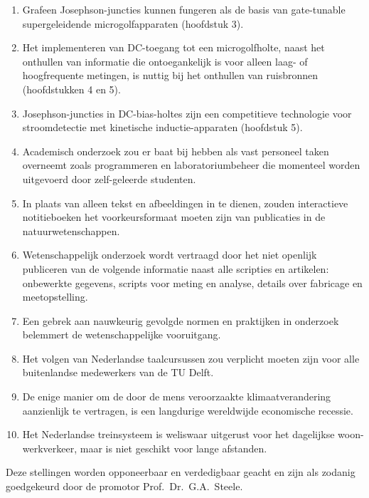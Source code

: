 \documentclass{dissertation-edit}
\begin{document}
{\begin{enumerate}
\item Grafeen Josephson-juncties kunnen fungeren als de basis van gate-tunable supergeleidende microgolfapparaten (hoofdstuk 3).
%
\item Het implementeren van DC-toegang tot een microgolfholte, naast het onthullen van informatie die ontoegankelijk is voor alleen laag- of hoogfrequente metingen, is nuttig bij het onthullen van ruisbronnen (hoofdstukken 4 en 5).
%
\item Josephson-juncties in DC-bias-holtes zijn een competitieve technologie voor stroomdetectie met kinetische inductie-apparaten (hoofdstuk 5).
%
\item Academisch onderzoek zou er baat bij hebben als vast personeel taken overneemt zoals programmeren en laboratoriumbeheer die momenteel worden uitgevoerd door zelf-geleerde studenten.
%
\item In plaats van alleen tekst en afbeeldingen in te dienen, zouden interactieve notitieboeken het voorkeursformaat moeten zijn van publicaties in de natuurwetenschappen.
%
\item Wetenschappelijk onderzoek wordt vertraagd door het niet openlijk publiceren van de volgende informatie naast alle scripties en artikelen: onbewerkte gegevens, scripts voor meting en analyse, details over fabricage en meetopstelling.
%
\item Een gebrek aan nauwkeurig gevolgde normen en praktijken in onderzoek belemmert de wetenschappelijke vooruitgang.
%
\item Het volgen van Nederlandse taalcursussen zou verplicht moeten zijn voor alle buitenlandse medewerkers van de TU Delft.
%
\item De enige manier om de door de mens veroorzaakte klimaatverandering aanzienlijk te vertragen, is een langdurige wereldwijde economische recessie.
%
\item Het Nederlandse treinsysteem is weliswaar uitgerust voor het dagelijkse woon-werkverkeer, maar is niet geschikt voor lange afstanden.

\end{enumerate}

\bigskip
\bigskip

\begin{center}
Deze stellingen worden opponeerbaar en verdedigbaar geacht en zijn als zodanig goedgekeurd door de promotor Prof.~Dr.~G.A.~Steele.
\end{center}

}
\end{document}

